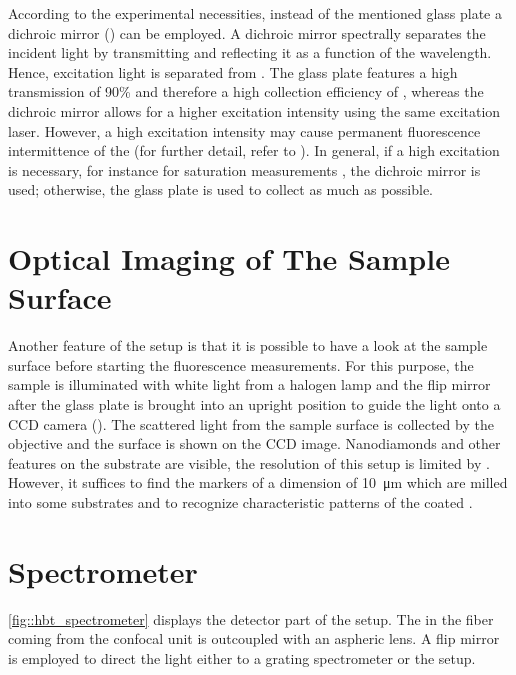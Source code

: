 		According to the experimental necessities, instead of the mentioned glass plate a dichroic mirror () can be employed.
		A dichroic mirror spectrally separates the incident light by transmitting and reflecting it as a function of the wavelength. 
		Hence, excitation light is separated from \fl.
		The glass plate features a high transmission of 90\% and therefore a high collection efficiency of \fl, whereas the dichroic mirror allows for a higher excitation intensity using the same excitation laser. 
		However, a high excitation intensity may cause permanent fluorescence intermittence of the \sivs (for further detail, refer to ).
		In general, if a high excitation is necessary, for instance for saturation measurements , the dichroic mirror is used; otherwise, the glass plate is used to collect as much \fl as possible.

	\section[Sample Surface]{Optical Imaging of The Sample Surface}

		Another feature of the setup is that it is possible to have a look at the sample surface before starting the fluorescence measurements.
		For this purpose, the sample is illuminated with white light from a halogen lamp and the flip mirror after the glass plate is brought into an upright position to guide the light onto a CCD camera ().
		The scattered light from the sample surface is collected by the objective and the surface is shown on the CCD image.
		Nanodiamonds and other features on the substrate are visible, the resolution of this setup is limited by .
		However, it suffices to find the markers of a dimension of \SI{10}{\micro\meter} which are milled into some substrates and to recognize characteristic patterns of the coated \nds.

	\section[Spectrometer]{Spectrometer}

		\autoref{fig::hbt_spectrometer} displays the detector part of the setup.
		The \fl in the fiber coming from the confocal unit is outcoupled with an aspheric lens. 
		A flip mirror is employed to direct the light either to a grating spectrometer or the \hbt setup.

